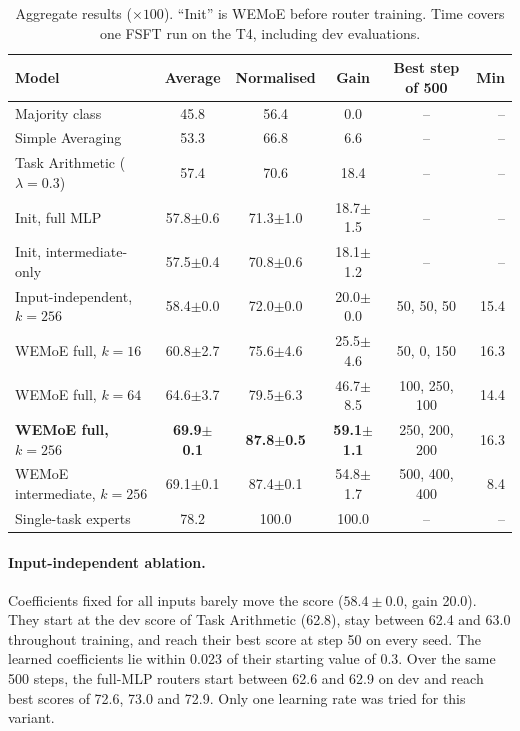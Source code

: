 \begin{table}[htbp]
  \centering\tablestyle
  \caption{Aggregate results ($\times100$). ``Init'' is WEMoE before router training. Time covers one FSFT run on the T4, including dev evaluations.}
  \label{tab:main}
  \begin{tabular}{l c c c c r}
    \toprule
    Model & Average & Normalised & Gain & Best step of 500 & Min\\
    \midrule
    Majority class & 45.8 & 56.4 & 0.0 & -- & --\\
    Simple Averaging & 53.3 & 66.8 & 6.6 & -- & --\\
    Task Arithmetic ($\lambda=0.3$) & 57.4 & 70.6 & 18.4 & -- & --\\
    Init, full MLP & 57.8$\pm$0.6 & 71.3$\pm$1.0 & 18.7$\pm$1.5 & -- & --\\
    Init, intermediate-only & 57.5$\pm$0.4 & 70.8$\pm$0.6 & 18.1$\pm$1.2 & -- & --\\
    Input-independent, $k=256$ & 58.4$\pm$0.0 & 72.0$\pm$0.0 & 20.0$\pm$0.0 & 50, 50, 50 & 15.4\\
    WEMoE full, $k=16$ & 60.8$\pm$2.7 & 75.6$\pm$4.6 & 25.5$\pm$4.6 & 50, 0, 150 & 16.3\\
    WEMoE full, $k=64$ & 64.6$\pm$3.7 & 79.5$\pm$6.3 & 46.7$\pm$8.5 & 100, 250, 100 & 14.4\\
    \textbf{WEMoE full, $k=256$} & \textbf{69.9$\pm$0.1} & \textbf{87.8$\pm$0.5} & \textbf{59.1$\pm$1.1} & 250, 200, 200 & 16.3\\
    WEMoE intermediate, $k=256$ & 69.1$\pm$0.1 & 87.4$\pm$0.1 & 54.8$\pm$1.7 & 500, 400, 400 & 8.4\\
    Single-task experts & 78.2 & 100.0 & 100.0 & -- & --\\
    \bottomrule
  \end{tabular}
\end{table}

\paragraph{Input-independent ablation.} Coefficients fixed for all inputs barely move the score ($58.4\pm0.0$, gain 20.0). They start at the dev score of Task Arithmetic (62.8), stay between 62.4 and 63.0 throughout training, and reach their best score at step 50 on every seed. The learned coefficients lie within 0.023 of their starting value of 0.3. Over the same 500 steps, the full-MLP routers start between 62.6 and 62.9 on dev and reach best scores of 72.6, 73.0 and 72.9. Only one learning rate was tried for this variant.

